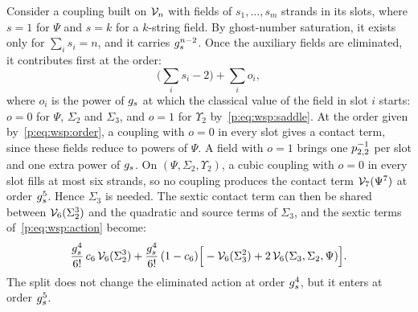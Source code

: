 Consider a coupling built on $\mathcal{V}_{n}$ with fields of $s_1, \dots, s_m$ strands in its slots, where $s = 1$ for $\Psi$ and $s = k$ for a $k$-string field.
  By ghost-number saturation, it exists only for $\sum_i s_i = n$, and it carries $g_s^{n - 2}$.
Once the auxiliary fields are eliminated, it contributes first at the order:
  \begin{equation}
  \label{p:eq:wsp:order}
  \Big( \sum_i s_i - 2 \Big)
    + \sum_i o_i,
\end{equation}
  where $o_i$ is the power of $g_s$ at which the classical value of the field in slot $i$ starts: $o = 0$ for $\Psi$, $\Sigma_2$ and $\Sigma_3$, and $o = 1$ for $\Upsilon_2$ by~\eqref{p:eq:wsp:saddle}.
  At the order given by~\eqref{p:eq:wsp:order}, a coupling with $o = 0$ in every slot gives a contact term, since these fields reduce to powers of $\Psi$.
  A field with $o = 1$ brings one $p_{2,2}^{-1}$ per slot and one extra power of $g_s$.
  On $(\Psi, \Sigma_2, \Upsilon_2)$, a cubic coupling with $o = 0$ in every slot fills at most six strands, so no coupling produces the contact term $\mathcal{V}_{7}(\Psi^7)$ at order $g_s^5$.
  Hence $\Sigma_3$ is needed.
  The sextic contact term can then be shared between $\mathcal{V}_{6}(\Sigma_2^3)$ and the quadratic and source terms of $\Sigma_3$, and the sextic terms of~\eqref{p:eq:wsp:action} become:
  \begin{equation}
  \label{p:eq:wsp:sextic-split}
  \frac{g_s^4}{6!} \, c_6 \, \mathcal{V}_{6}(\Sigma_2^3)
    + \frac{g_s^4}{6!} \, (1 - c_6) \Big[
      - \mathcal{V}_{6}(\Sigma_3^2)
      + 2 \, \mathcal{V}_{6}(\Sigma_3, \Sigma_2, \Psi)
    \Big].
\end{equation}
  The split does not change the eliminated action at order $g_s^4$, but it enters at order $g_s^5$.

